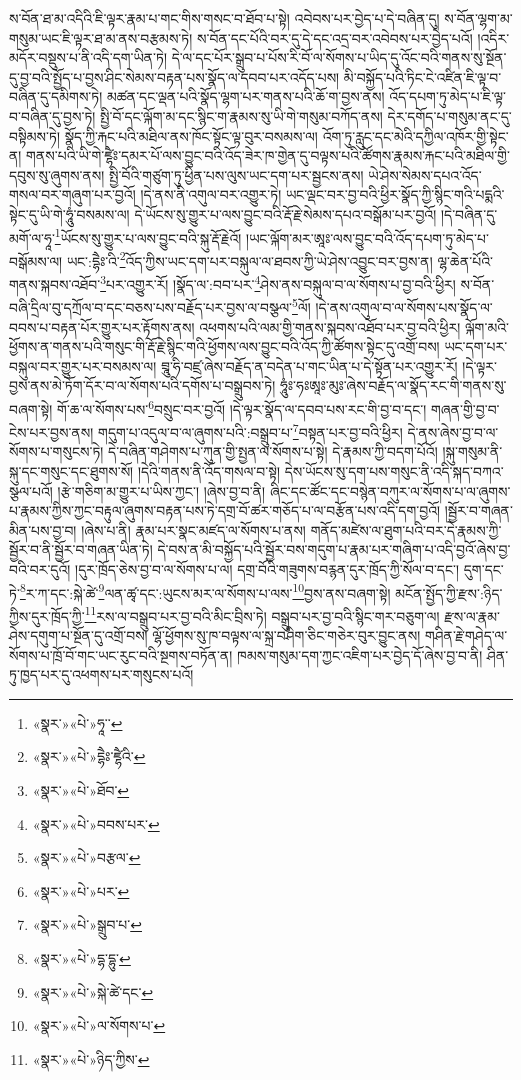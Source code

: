 ས་བོན་ཐ་མ་འདིའི་ཇི་ལྟར་རྣམ་པ་གང་གིས་གསང་བ་ཐོབ་པ་སྟེ། འབེབས་པར་བྱེད་པ་དེ་བཞིན་དུ། ས་བོན་ལྷག་མ་གསུམ་ཡང་ཇི་ལྟར་ཐ་མ་ནས་བརྩམས་ཏེ། ས་བོན་དང་པོའི་བར་དུ་དེ་དང་འདྲ་བར་འབེབས་པར་བྱེད་པའོ། །འདིར་མདོར་བསྡུས་པ་ནི་འདི་དག་ཡིན་ཏེ། དེ་ལ་དང་པོར་སྒྲུབ་པ་པོས་རི་བོ་ལ་སོགས་པ་ཡིད་དུ་འོང་བའི་གནས་སུ་སྔོན་དུ་བྱ་བའི་སྤྱོད་པ་བྱས་ཤིང་སེམས་བརྟན་པས་སྣོད་ལ་དབབ་པར་འདོད་པས། མི་བསྐྱོད་པའི་ཏིང་ངེ་འཛིན་ཇི་ལྟ་བ་བཞིན་དུ་དམིགས་ཏེ། མཚན་དང་ལྡན་པའི་སྣོད་ལྷག་པར་གནས་པའི་ཆོ་ག་བྱས་ནས། འོད་དཔག་ཏུ་མེད་པ་ཇི་ལྟ་བ་བཞིན་དུ་བྱས་ཏེ། སྤྱི་བོ་དང་ལྐོག་མ་དང་སྙིང་ག་རྣམས་སུ་ཡི་གེ་གསུམ་བཀོད་ནས། དེར་དགོད་པ་གསུམ་ནང་དུ་བསྟིམས་ཏེ། སྣོད་ཀྱི་རྐང་པའི་མཐིལ་ནས་ཁོང་སྟོང་ལྟ་བུར་བསམས་ལ། འོག་ཏུ་རླུང་དང་མེའི་དཀྱིལ་འཁོར་གྱི་སྟེང་ན། གནས་པའི་ཡི་གེ་ཛྷཻཿ་དམར་པོ་ལས་བྱུང་བའི་འོད་ཟེར་ཁ་གྱེན་དུ་བལྟས་པའི་ཚོགས་རྣམས་རྐང་པའི་མཐིལ་གྱི་དབུས་སུ་ཞུགས་ནས། སྤྱི་བོའི་གཙུག་ཏུ་ཕྱིན་པས་ལུས་ཡང་དག་པར་སྦྱངས་ནས། ཡེ་ཤེས་སེམས་དཔའ་འོད་གསལ་བར་གཞུག་པར་བྱའོ། །དེ་ནས་ནི་འགུལ་བར་འགྱུར་ཏེ། ཡང་ལྡང་བར་བྱ་བའི་ཕྱིར་སྣོད་ཀྱི་སྙིང་གའི་པདྨའི་སྟེང་དུ་ཡི་གེ་ཧཱུཾ་བསམས་ལ། དེ་ཡོངས་སུ་གྱུར་པ་ལས་བྱུང་བའི་རྡོ་རྗེ་སེམས་དཔའ་བསྒོམ་པར་བྱའོ། །དེ་བཞིན་དུ་མགོ་ལ་ཧཱ་\footnote{«སྣར་»«པེ་»ཧཱ་་}ཡོངས་སུ་གྱུར་པ་ལས་བྱུང་བའི་སྐུ་རྡོ་རྗེའོ། །ཡང་ལྐོག་མར་ཨཱཿ་ལས་བྱུང་བའི་འོད་དཔག་ཏུ་མེད་པ་བསྒོམས་ལ། ཡང་:དྷཻཿ་འི་\footnote{«སྣར་»«པེ་»དྷཻཿ་ཛྷཻའི་}འོད་ཀྱིས་ཡང་དག་པར་བསྐུལ་ལ་ཐབས་ཀྱི་ཡེ་ཤེས་འབྱུང་བར་བྱས་ན། ལྷ་ཆེན་པོའི་གནས་སྐབས་འཐོབ་\footnote{«སྣར་»«པེ་»ཐོབ་}པར་འགྱུར་རོ། །སྣོད་ལ་:བབ་པར་\footnote{«སྣར་»«པེ་»བབས་པར་}ཤེས་ནས་བསྐུལ་བ་ལ་སོགས་པ་བྱ་བའི་ཕྱིར། ས་བོན་བཞི་དྲིལ་བུ་དཀྲོལ་བ་དང་བཅས་པས་བརྗོད་པར་བྱས་ལ་བསྩལ་\footnote{«སྣར་»«པེ་»བརྩལ་}ལོ། །དེ་ནས་འགུལ་བ་ལ་སོགས་པས་སྣོད་ལ་བབས་པ་བརྟན་པོར་གྱུར་པར་རྟོགས་ནས། འཕགས་པའི་ལམ་གྱི་གནས་སྐབས་འཐོབ་པར་བྱ་བའི་ཕྱིར། ལྐོག་མའི་ཕྱོགས་ན་གནས་པའི་གསུང་གི་རྡོ་རྗེ་སྙིང་གའི་ཕྱོགས་ལས་བྱུང་བའི་འོད་ཀྱི་ཚོགས་སྟེང་དུ་འགྲོ་བས། ཡང་དག་པར་བསྐུལ་བར་གྱུར་པར་བསམས་ལ། བྲཱུ་ཧི་བཛྲ་ཞེས་བརྗོད་ན་བདེན་པ་གང་ཡིན་པ་དེ་སྟོན་པར་འགྱུར་རོ། །དེ་ལྟར་བྱས་ནས་མེ་ཏོག་དོར་བ་ལ་སོགས་པའི་དགོས་པ་བསྒྲུབས་ཏེ། ཧཱུཾཿ་ཧཿཨཱཿ་མུཿ་ཞེས་བརྗོད་ལ་སྣོད་རང་གི་གནས་སུ་བཞག་སྟེ། གོ་ཆ་ལ་སོགས་པས་\footnote{«སྣར་»«པེ་»པར་}བསྲུང་བར་བྱའོ། །དེ་ལྟར་སྣོད་ལ་དབབ་པས་རང་གི་བྱ་བ་དང་། གཞན་གྱི་བྱ་བ་ངེས་པར་བྱས་ནས། གདུག་པ་འདུལ་བ་ལ་ཞུགས་པའི་:བསྒྲུབ་པ་\footnote{«སྣར་»«པེ་»སྒྲུབ་པ་}བསྟན་པར་བྱ་བའི་ཕྱིར། དེ་ནས་ཞེས་བྱ་བ་ལ་སོགས་པ་གསུངས་ཏེ། དེ་བཞིན་གཤེགས་པ་ཀུན་གྱི་སྤྱན་ལ་སོགས་པ་སྟེ། དེ་རྣམས་ཀྱི་བདག་པོའོ། །སྐུ་གསུམ་ནི་སྐུ་དང་གསུང་དང་ཐུགས་སོ། །དེའི་གནས་ནི་འོད་གསལ་བ་སྟེ། དེས་ཡོངས་སུ་དག་པས་གསུང་ནི་འདི་སྐད་བཀའ་སྩལ་པའོ། །རྩེ་གཅིག་མ་གྱུར་པ་ཡིས་ཀྱང་། །ཞེས་བྱ་བ་ནི། ཞིང་དང་ཚོང་དང་བསྙེན་བཀུར་ལ་སོགས་པ་ལ་ཞུགས་པ་རྣམས་ཀྱིས་ཀྱང་བརྟུལ་ཞུགས་བརྟན་པས་ཏེ་དགྲ་བོ་ཚར་གཅོད་པ་ལ་བརྩོན་པས་འདི་དག་བྱའོ། །སྦྱོར་བ་གཞན་མིན་པས་བྱ་བ། །ཞེས་པ་ནི། རྣམ་པར་སྣང་མཛད་ལ་སོགས་པ་ནས། གནོད་མཛེས་ལ་ཐུག་པའི་བར་དེ་རྣམས་ཀྱི་སྦྱོར་བ་ནི་སྦྱོར་བ་གཞན་ཡིན་ཏེ། དེ་བས་ན་མི་བསྐྱོད་པའི་སྦྱོར་བས་གདུག་པ་རྣམ་པར་གཞིག་པ་འདི་བྱའོ་ཞེས་བྱ་བའི་བར་དུའོ། །དུར་ཁྲོད་ཅེས་བྱ་བ་ལ་སོགས་པ་ལ། དགྲ་བོའི་གཟུགས་བརྙན་དུར་ཁྲོད་ཀྱི་སོལ་བ་དང་། དུག་དང་ཏེ་\footnote{«སྣར་»«པེ་»དྷ་དྷུ་}ར་ཀ་དང་:སྐེ་ཚེ་\footnote{«སྣར་»«པེ་»སྐེ་ཚེ་དང་}ལན་ཚྭ་དང་:ཡུངས་མར་ལ་སོགས་པ་ལས་\footnote{«སྣར་»«པེ་»ལ་སོགས་པ་}བྱས་ནས་བཞག་སྟེ། མངོན་སྤྱོད་ཀྱི་རྫས་:ཉིད་ཀྱིས་དུར་ཁྲོད་ཀྱི་\footnote{«སྣར་»«པེ་»ཉིད་ཀྱིས་}རས་ལ་བསྒྲུབ་པར་བྱ་བའི་མིང་བྲིས་ཏེ། བསྒྲུབ་པར་བྱ་བའི་སྙིང་གར་བཅུག་ལ། རྫས་ལ་རྣམ་ཤེས་དགུག་པ་སྔོན་དུ་འགྲོ་བས། ལྷོ་ཕྱོགས་སུ་ཁ་བལྟས་ལ་སྐྲ་བཤིག་ཅིང་གཅེར་བུར་བྱུང་ནས། གཤིན་རྗེ་གཤེད་ལ་སོགས་པ་ཁྲོ་བོ་གང་ཡང་རུང་བའི་སྔགས་བཏོན་ན། ཁམས་གསུམ་དག་ཀྱང་འཇིག་པར་བྱེད་དོ་ཞེས་བྱ་བ་ནི། ཤིན་ཏུ་ཁྱད་པར་དུ་འཕགས་པར་གསུངས་པའོ། 